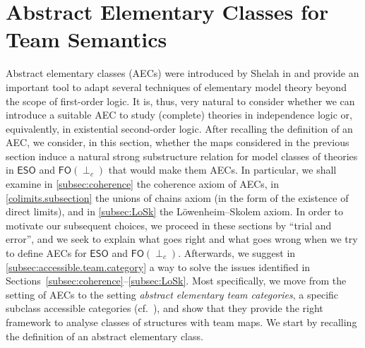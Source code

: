 \documentclass[a4paper]{amsart}
\theoremstyle{definition}
\theoremstyle{remark}
\newcommand\eso{\mathsf{ESO}}
\newcommand\foil{\mathsf{FO}(\perp_c)}
\theoremstyle{definition}
\begin{document}
\section{Abstract Elementary Classes for Team Semantics}\label{Section_AEC}

Abstract elementary classes (AECs) were introduced by Shelah in  \cite{shelah2006classification} and provide an important tool to adapt several techniques of elementary model theory beyond the scope of first-order logic. It is, thus, very natural to consider whether we can introduce a suitable AEC to study (complete) theories in independence logic or, equivalently, in existential second-order logic. After recalling the definition of an AEC, we consider, in this section, whether the maps considered in the previous section induce a natural strong substructure relation for model classes of theories in $\eso$ and $\foil$ that would make them AECs. In particular, we shall examine in \cref{subsec:coherence} the coherence axiom of AECs, in \cref{colimits.subsection} the unions of chains axiom (in the form of the existence of direct limits), and in \cref{subsec:LoSk} the Löwenheim--Skolem axiom. In order to motivate our subsequent choices, we proceed in these sections by ``trial and error'', and we seek to explain what goes right and what goes wrong when we try to define AECs for $\eso$ and $\foil$. Afterwards, we suggest in \cref{subsec:accessible.team.category} a way to solve the issues identified in  Sections~\ref{subsec:coherence}--\ref{subsec:LoSk}. Most specifically, we move from the setting of AECs to the setting \emph{abstract elementary team categories}, a specific subclass accessible categories
(cf.~\cite{adamek1994locally}),
and show that they provide the right framework to analyse classes of structures with team maps. We start by recalling the definition of an abstract elementary class.
\end{document}
